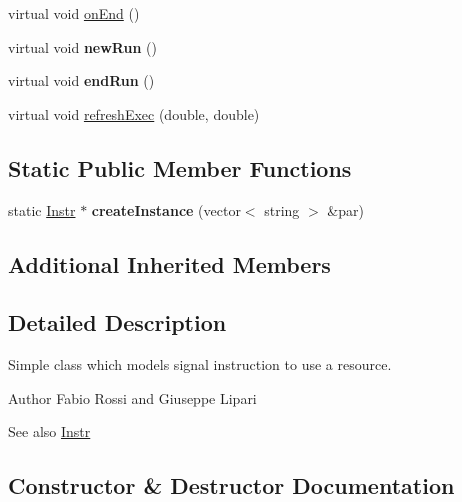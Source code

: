 \begin{DoxyCompactItemize}
\item 
virtual void \hyperlink{classRTSim_1_1SignalInstr_af100123e7c49e984cad6d76442004095}{on\+End} ()
\item 
virtual void {\bfseries new\+Run} ()\hypertarget{classRTSim_1_1SignalInstr_ae90223cfba4c390c107edd9c7131a9b2}{}\label{classRTSim_1_1SignalInstr_ae90223cfba4c390c107edd9c7131a9b2}

\item 
virtual void {\bfseries end\+Run} ()\hypertarget{classRTSim_1_1SignalInstr_a4f423dfd7712c8579bb34cd8717a1bcc}{}\label{classRTSim_1_1SignalInstr_a4f423dfd7712c8579bb34cd8717a1bcc}

\item 
virtual void \hyperlink{classRTSim_1_1SignalInstr_a7a3674633352b03da78c672c70d34331}{refresh\+Exec} (double, double)
\end{DoxyCompactItemize}
\subsection*{Static Public Member Functions}
\begin{DoxyCompactItemize}
\item 
static \hyperlink{classRTSim_1_1Instr}{Instr} $\ast$ {\bfseries create\+Instance} (vector$<$ string $>$ \&par)\hypertarget{classRTSim_1_1SignalInstr_afd00ddb299b7674a4699a7b022fb0bac}{}\label{classRTSim_1_1SignalInstr_afd00ddb299b7674a4699a7b022fb0bac}

\end{DoxyCompactItemize}
\subsection*{Additional Inherited Members}


\subsection{Detailed Description}
Simple class which models signal instruction to use a resource. \begin{DoxyAuthor}{Author}
Fabio Rossi and Giuseppe Lipari 
\end{DoxyAuthor}
\begin{DoxySeeAlso}{See also}
\hyperlink{classRTSim_1_1Instr}{Instr} 
\end{DoxySeeAlso}


\subsection{Constructor \& Destructor Documentation}
